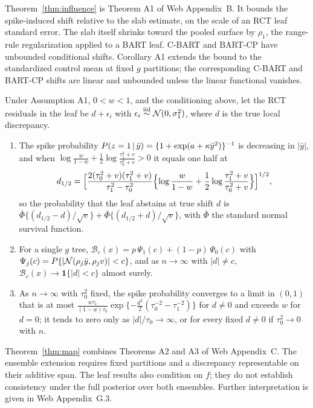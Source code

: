 Theorem~\ref{thm:influence} is Theorem A1 of Web Appendix~B. It bounds the spike-induced shift relative to the slab estimate, on the scale of an RCT leaf standard error. The slab itself shrinks toward the pooled surface by $\rho_1$, the range-rule regularization applied to a BART leaf. C-BART and BART-CP have unbounded conditional shifts. Corollary A1 extends the bound to the standardized control mean at fixed $g$ partitions; the corresponding C-BART and BART-CP shifts are linear and unbounded unless the linear functional vanishes.

\begin{theorem}\label{thm:map}
Under Assumption A1, $0<w<1$, and the conditioning above, let the RCT residuals in the leaf be $d+\epsilon_i$ with $\epsilon_i\stackrel{\text{iid}}{\sim}\mathcal{N}(0,\sigma_1^2)$, where $d$ is the true local discrepancy.
\begin{enumerate}[label=(\alph*),leftmargin=2.2em]
\item The spike probability $P(z=1\,\vert\,\bar y)=\{1+\exp(a+\kappa\bar y^2)\}^{-1}$ is decreasing in $|\bar y|$, and when $\log\frac w{1-w}+\frac12\log\frac{\tau_1^2+v}{\tau_0^2+v}>0$ it equals one half at
\[
d_{1/2}=\Bigl[\frac{2(\tau_0^2+v)(\tau_1^2+v)}{\tau_1^2-\tau_0^2}\Bigl\{\log\frac w{1-w}+\frac12\log\frac{\tau_1^2+v}{\tau_0^2+v}\Bigr\}\Bigr]^{1/2},
\]
so the probability that the leaf abstains at true shift $d$ is $\bar\Phi\{(d_{1/2}-d)/\sqrt v\}+\bar\Phi\{(d_{1/2}+d)/\sqrt v\}$, with $\bar\Phi$ the standard normal survival function.
\item For a single $g$ tree, $\mathcal B_c(x)=p\,\Psi_1(c)+(1-p)\,\Psi_0(c)$ with $\Psi_j(c)=P\{|\mathcal{N}(\rho_j\bar y,\rho_jv)|<c\}$, and as $n\to\infty$ with $|d|\ne c$, $\mathcal B_c(x)\to\mathbf 1\{|d|<c\}$ almost surely.
\item As $n\to\infty$ with $\tau_0^2$ fixed, the spike probability converges to a limit in $(0,1)$ that is at most $\frac{w\tau_1}{(1-w)\tau_0}\exp\{-\frac{d^2}2(\tau_0^{-2}-\tau_1^{-2})\}$ for $d\ne0$ and exceeds $w$ for $d=0$; it tends to zero only as $|d|/\tau_0\to\infty$, or for every fixed $d\ne0$ if $\tau_0^2\to0$ with $n$.
\end{enumerate}
\end{theorem}

Theorem~\ref{thm:map} combines Theorems A2 and A3 of Web Appendix~C. The ensemble extension requires fixed partitions and a discrepancy representable on their additive span. The leaf results also condition on $f$; they do not establish consistency under the full posterior over both ensembles. Further interpretation is given in Web Appendix~G.3.

